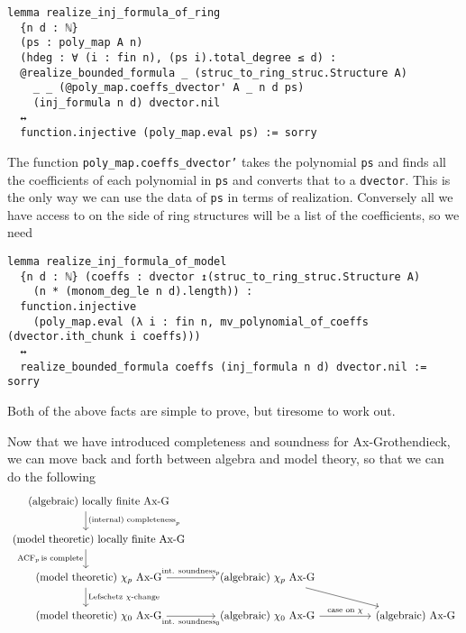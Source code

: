 \begin{lstlisting}
lemma realize_inj_formula_of_ring
  {n d : ℕ}
  (ps : poly_map A n)
  (hdeg : ∀ (i : fin n), (ps i).total_degree ≤ d) :
  @realize_bounded_formula _ (struc_to_ring_struc.Structure A)
    _ _ (@poly_map.coeffs_dvector' A _ n d ps)
    (inj_formula n d) dvector.nil
  ↔
  function.injective (poly_map.eval ps) := sorry \end{lstlisting}

The function \texttt{poly\_map.coeffs\_dvector'} takes the polynomial \texttt{ps}
and finds all the coefficients of each polynomial in \texttt{ps}
and converts that to a \texttt{dvector}.
This is the only way we can use the data of \texttt{ps} in terms of realization.
Conversely all we have access to on the side of ring structures
will be a list of the coefficients, so we need

\begin{lstlisting}
lemma realize_inj_formula_of_model
  {n d : ℕ} (coeffs : dvector ↥(struc_to_ring_struc.Structure A)
    (n * (monom_deg_le n d).length)) :
  function.injective
    (poly_map.eval (λ i : fin n, mv_polynomial_of_coeffs (dvector.ith_chunk i coeffs)))
  ↔
  realize_bounded_formula coeffs (inj_formula n d) dvector.nil := sorry
\end{lstlisting}

Both of the above facts are simple to prove,
but tiresome to work out.


Now that we have introduced completeness and soundness for
Ax-Grothendieck, we can move back and forth between
algebra and model theory, so that we can do the following
\[\begin{tikzcd}
	{\text{(algebraic) locally finite Ax-G}} \\
	{\text{(model theoretic) locally finite Ax-G}} \\
	{\text{(model theoretic) }\chi_p \text{ Ax-G}} & {\text{(algebraic) }\chi_p \text{ Ax-G}} \\
	{\text{(model theoretic) }\chi_0 \text{ Ax-G}} & {\text{(algebraic) }\chi_0 \text{ Ax-G}} && {\text{(algebraic) Ax-G}}
	\arrow["{\ACF_{p} \text{is complete}}"', shift right=5, from=2-1, to=3-1]
	\arrow["{\text{(internal) completeness}_p}", shift right=5, from=1-1, to=2-1]
	\arrow["{\text{Lefschetz }\chi\text{-change}}", shift right=5, from=3-1, to=4-1]
	\arrow["{\text{int. soundness}_p}", from=3-1, to=3-2]
	\arrow["{\text{int. soundness}_0}"', from=4-1, to=4-2]
	\arrow[from=3-2, to=4-4]
	\arrow["{\text{case on }\chi}", from=4-2, to=4-4]
\end{tikzcd}\]

